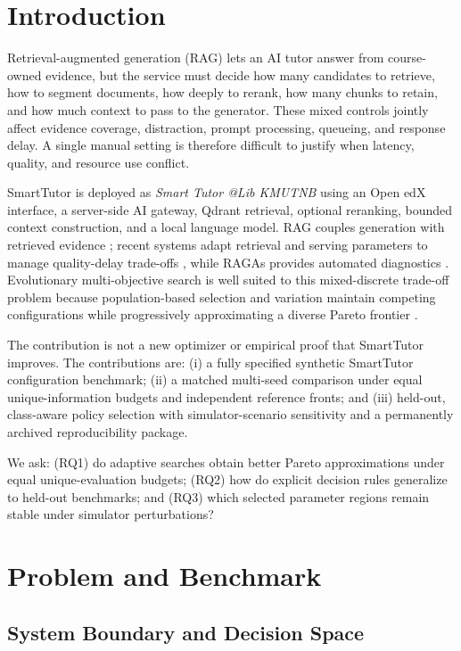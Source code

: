 \documentclass[runningheads]{llncs}
\begin{document}
\section{Introduction}

Retrieval-augmented generation (RAG) lets an AI tutor answer from course-owned evidence, but the service must decide how many candidates to retrieve, how to segment documents, how deeply to rerank, how many chunks to retain, and how much context to pass to the generator. These mixed controls jointly affect evidence coverage, distraction, prompt processing, queueing, and response delay. A single manual setting is therefore difficult to justify when latency, quality, and resource use conflict.

SmartTutor is deployed as \emph{Smart Tutor @Lib KMUTNB} \cite{smarttutorweb} using an Open edX interface, a server-side AI gateway, Qdrant retrieval, optional reranking, bounded context construction, and a local language model. RAG couples generation with retrieved evidence \cite{lewis,dpr}; recent systems adapt retrieval and serving parameters to manage quality-delay trade-offs \cite{metis,rago}, while RAGAs provides automated diagnostics \cite{ragas}. Evolutionary multi-objective search is well suited to this mixed-discrete trade-off problem because population-based selection and variation maintain competing configurations while progressively approximating a diverse Pareto frontier \cite{nsga2,spea2}.

The contribution is not a new optimizer or empirical proof that SmartTutor improves. The contributions are: (i) a fully specified synthetic SmartTutor configuration benchmark; (ii) a matched multi-seed comparison under equal unique-information budgets and independent reference fronts; and (iii) held-out, class-aware policy selection with simulator-scenario sensitivity and a permanently archived reproducibility package.

We ask: (RQ1) do adaptive searches obtain better Pareto approximations under equal unique-evaluation budgets; (RQ2) how do explicit decision rules generalize to held-out benchmarks; and (RQ3) which selected parameter regions remain stable under simulator perturbations?

\section{Problem and Benchmark}

\subsection{System Boundary and Decision Space}
\end{document}
